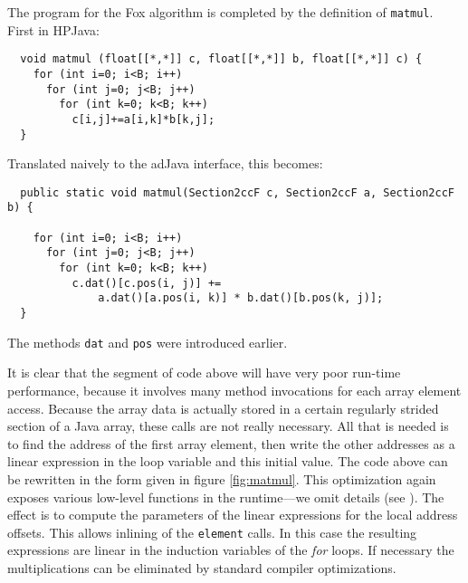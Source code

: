The program for the Fox algorithm is completed by the definition of
\texttt{matmul}.  First in HPJava:
\begin{small}
\begin{verbatim}
  void matmul (float[[*,*]] c, float[[*,*]] b, float[[*,*]] c) {
    for (int i=0; i<B; i++)
      for (int j=0; j<B; j++)
        for (int k=0; k<B; k++) 
          c[i,j]+=a[i,k]*b[k,j];
  }
\end{verbatim}
\end{small}   
Translated naively to the adJava interface, this becomes:
\begin{small}
\begin{verbatim}
  public static void matmul(Section2ccF c, Section2ccF a, Section2ccF b) {

    for (int i=0; i<B; i++)
      for (int j=0; j<B; j++)
        for (int k=0; k<B; k++)
          c.dat()[c.pos(i, j)] +=
              a.dat()[a.pos(i, k)] * b.dat()[b.pos(k, j)];
  }
\end{verbatim}
\end{small}   
The methods \texttt{dat} and \texttt{pos} were introduced
earlier.

It is clear that the segment of code above will have very poor run-time
performance, because it involves many method invocations for each
array element access.  Because the array data is actually stored
in a certain regularly strided section of a Java array, these calls are not
really necessary.  All that is needed is to find the address of the
first array element, then write the other addresses as
a linear expression in the loop variable and this initial value.
The code above can be rewritten in the form given in figure
\ref{fig:matmul}.  This optimization again exposes various low-level
functions in the runtime---we omit details
(see \cite{NPAC_PCRC_kernel}).  
The effect is to compute the parameters of the linear
expressions for the local address offsets.  This allows inlining of the
{\tt element} calls.  In this case the resulting expressions are linear
in the induction variables of the {\em for} loops.  If necessary the
multiplications can be eliminated by standard compiler optimizations.

